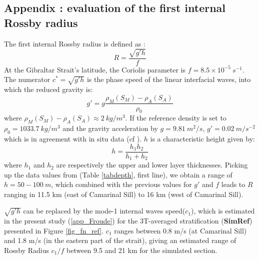 \subsection{Appendix : evaluation of the first internal Rossby radius}
\label{app_Rossby}

The first internal Rossby radius is defined as :
\begin{equation}
\label{eqRosby}
R = \frac{\sqrt{g'h}}{f}
\end{equation} 
 At the Gibraltar Strait's latitude, the Coriolis parameter is $f=8.5 \times 10^{-5}\ s^{-1}$.
The numerator $c^{*}={\sqrt{g'h}}$ is the phase speed of the linear interfacial waves, into which the reduced gravity is:
\begin{equation}
g'= g \frac{\rho_M(S_M) - \rho_A(S_A)}{\rho_0}
\end{equation}
where $\rho_M(S_M) - \rho_A(S_A) \approx 2\ kg/m^{3}$. If the reference density is set to $\rho_0=1033.7\ kg/m^{3}$ and the gravity acceleration by $g=9.81\ m^2/s$, $g'=0.02\ m/s^{-2}$ which is in agreement with in situ data (cf \citet{Bryden94}). $h$ is a characteristic height given by:
\begin{equation}
h=\frac{h_1 h_2}{h_1+h_2}
\end{equation}
where $h_1$ and $h_2$ are respectively the upper and lower layer thicknesses. Picking up the data values from \citet{FA1988} (Table \ref{tabdepth}, first line), we obtain a range of $h = 50 - 100\ m$, which combined with the previous values for $g'$ and $f$ leads to $R$ ranging in 11.5 km (east of Camarinal Sill) to 16 km (west of Camarinal Sill). 

$\sqrt{g'h}$ can be replaced by the mode-1 internal waves speed($c_1$), which is estimated in the present study (\ref{app_Froude}) for the 3T-averaged stratification (\textbf{SimRef}) presented in Figure \ref{fig_fn_ref}. $c_1$ ranges between 0.8 m/s (at Camarinal Sill) and 1.8 m/s (in the eastern part of the strait), giving an estimated range of Rossby Radius ${c_1}/{f}$ between 9.5 and 21 km for the simulated section.


